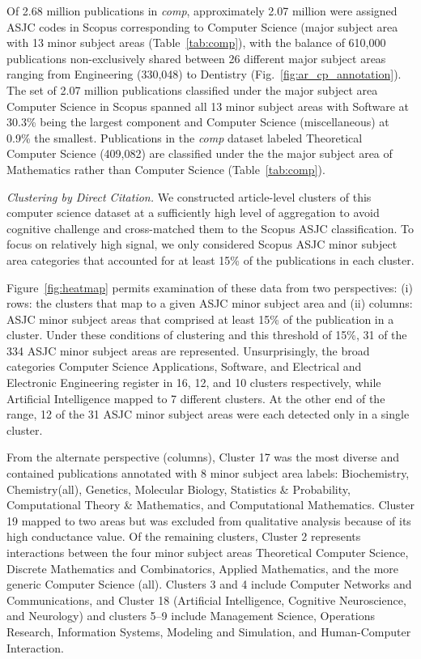 Of 2.68 million publications in \emph{comp}, approximately 2.07 million were assigned ASJC codes in Scopus corresponding to Computer Science (major subject area with 13 minor subject areas (Table~\ref{tab:comp}), with the balance of 610,000 publications non-exclusively shared between 26 different major subject areas ranging from Engineering (330,048) to Dentistry (Fig.~\ref{fig:ar_cp_annotation}). The set of 2.07 million publications classified under the major subject area Computer Science in Scopus spanned all 13 minor subject areas with Software at 30.3\%  being the largest component and Computer Science (miscellaneous) at 0.9\% the smallest. Publications in the \emph{comp} dataset labeled Theoretical Computer Science (409,082) are classified under the the major subject area of Mathematics rather than Computer Science (Table~\ref{tab:comp}). 

\emph{Clustering by Direct Citation.} We constructed article-level clusters of this computer science dataset at a sufficiently high level of aggregation to avoid cognitive challenge and cross-matched them to the Scopus ASJC classification. To focus on relatively high signal, we only considered Scopus ASJC minor subject area categories that accounted for at least 15\% of the publications in each cluster. 

Figure~\ref{fig:heatmap} permits examination of these data from two perspectives: (i) rows: the clusters that map to a given ASJC minor subject area and (ii) columns: ASJC minor subject areas that comprised at least 15\% of the publication in a cluster. Under these conditions of clustering and this threshold of 15\%, 31 of the 334 ASJC minor subject areas are represented. Unsurprisingly, the broad categories Computer Science Applications, Software, and Electrical and Electronic Engineering register in 16, 12, and 10 clusters respectively, while Artificial Intelligence mapped to 7 different clusters. At the other end of the range, 12 of the 31 ASJC minor subject areas were each detected only in a single cluster. 

From the alternate perspective (columns), Cluster 17 was the most diverse and contained publications annotated with 8 minor subject area labels: Biochemistry, Chemistry(all), Genetics, Molecular Biology,  Statistics \& Probability, Computational Theory \& Mathematics, and Computational Mathematics. Cluster 19 mapped to two areas but was excluded from qualitative analysis because of its high conductance value. 
Of the remaining clusters, Cluster 2 represents interactions between the four minor subject areas Theoretical Computer Science, Discrete Mathematics and Combinatorics, Applied Mathematics,  and the more generic Computer Science (all). Clusters 3 and 4 include Computer Networks and Communications, and Cluster 18 (Artificial Intelligence, Cognitive Neuroscience, and Neurology) and clusters 5--9 include Management Science, Operations Research, Information Systems, Modeling and Simulation, and Human-Computer Interaction.

